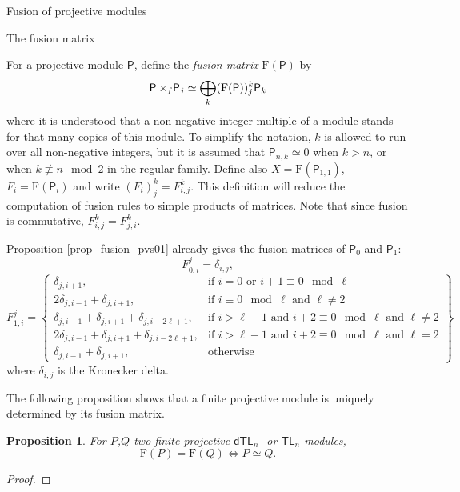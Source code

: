 \documentclass[reqno]{amsart}
\newtheorem{Prop}[Thm]{Proposition}
\newcommand{\dtl}[1]{\mathsf{dTL}_{#1}}
\newcommand{\tl}[1]{\mathsf{TL}_{#1}}
\newcommand{\dP}[1]{\mathsf P_{#1}}
\newcommand{\xf}{\times\hspace{-0.27em}_f}
\newcommand{\F}[1]{F_{#1}}
\newcommand{\lc}{\ell}
\begin{document}
\begin{section}{Fusion of projective modules}
\begin{subsection}{The fusion matrix}

For a projective module $\mathsf{P}$, define the \emph{fusion matrix} $\text{F}(\mathsf{P})$ by $$ \mathsf{P} \xf \dP{j} \simeq \bigoplus_{k} (\text{F}(\mathsf{P}))_{j}^{k} \dP{k}$$ where it is understood that a non-negative integer multiple of a module stands for that many copies of this module. To simplify the notation, $k$ is allowed to run over all non-negative integers, but it is assumed that $\dP{n,k}\simeq 0$ when $k >n$, or when $k \not\equiv n \mod 2$ in the regular family. Define also $X = \text{F}(\dP{1,1})$, $\F{i} = \text{F} (\dP{i})$ and write $(\F{i})^{k}_{j} = \F{i,j}^{k}$. This definition will reduce the computation of fusion rules to simple products of matrices. Note that since fusion is commutative, $\F{i,j}^{k} = \F{j,i}^{k}$.

Proposition \ref{prop_fusion_pvs01} already gives the fusion matrices of $\dP{0}$ and $\dP{1}$:
\begin{equation}
\F{0,i}^{j} = \delta_{i,j},
\end{equation}
\begin{equation}
\F{1,i}^{j} = \left. \begin{cases}
\delta_{j,i+1}, & \textrm{if } i=0 \text{ or } i+1 \equiv 0 \mod \lc\\
2\delta_{j,i-1} + \delta_{j,i+1}, & \textrm{if } i \equiv 0\mod \lc \text{ and } \lc \neq 2\\
\delta_{j,i-1} + \delta_{j,i+1} + \delta_{j, i-2\lc +1}, & \textrm{if } i>\lc-1 \text{ and } i+2 \equiv 0\mod \lc \text{ and } \lc \neq 2\\
2\delta_{j,i-1} + \delta_{j,i+1} + \delta_{j, i-2\lc +1}, & \textrm{if } i>\lc-1 \text{ and } i+2 \equiv 0\mod \lc \text{ and } \lc =2 \\
\delta_{j,i-1} + \delta_{j,i+1}, & \textrm{otherwise}
\end{cases}\right\}
\end{equation}
where $\delta_{i,j}$ is the Kronecker delta.

The following proposition shows that a finite projective module is uniquely determined by its fusion matrix.
\begin{Prop}\label{prop:fmatrixunique}
For $P$,$Q$ two finite projective $\dtl{n}$- or $\tl{n}$-modules,
\begin{equation*}
\text{F}(P) = \text{F}(Q) \iff P \simeq Q.
\end{equation*}
\end{Prop}
\begin{proof}


\end{proof}
\end{subsection}
\end{section}
\end{document}
